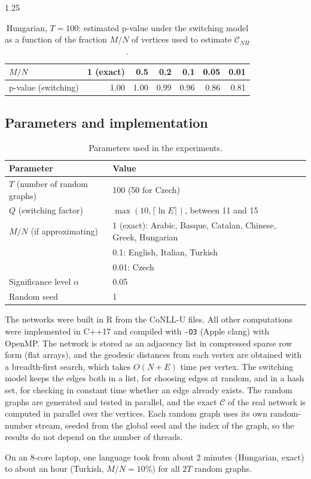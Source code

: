 \documentclass[12pt]{article}
\newcommand{\metric}{\mathcal{C}}
\begin{document}
\begin{spacing}{1.25}
\begin{table}[H]
    \centering
    \begin{tabular}{lrrrrrr}
        \toprule
        $M/N$ & 1 (exact) & 0.5 & 0.2 & 0.1 & 0.05 & 0.01 \\
        \midrule
        p-value (switching) & 1.00 & 1.00 & 0.99 & 0.96 & 0.86 & 0.81 \\
        \bottomrule
    \end{tabular}
    \caption{Hungarian, $T=100$: estimated p-value under the switching model as a function of the fraction $M/N$ of vertices used to estimate $\metric_{NH}$.}
    \label{tab:validation}
\end{table}

\subsection{Parameters and implementation}
\begin{table}[H]
    \centering
    \begin{tabular}{lp{8.5cm}}
        \toprule
        Parameter & Value \\
        \midrule
        $T$ (number of random graphs) & 100 (50 for Czech) \\
        $Q$ (switching factor) & $\max(10,\lceil\ln E\rceil)$, between 11 and 15 \\
        $M/N$ (if approximating) & 1 (exact): Arabic, Basque, Catalan, Chinese, Greek, Hungarian \\
         & 0.1: English, Italian, Turkish \\
         & 0.01: Czech \\
        Significance level $\alpha$ & 0.05 \\
        Random seed & 1 \\
        \bottomrule
    \end{tabular}
    \caption{Parameters used in the experiments.}
    \label{tab:params}
\end{table}

The networks were built in R from the CoNLL-U files. All other computations were implemented in C++17 and compiled with \texttt{-O3} (Apple clang) with OpenMP. The network is stored as an adjacency list in compressed sparse row form (flat arrays), and the geodesic distances from each vertex are obtained with a breadth-first search, which takes $O(N+E)$ time per vertex. The switching model keeps the edges both in a list, for choosing edges at random, and in a hash set, for checking in constant time whether an edge already exists. The random graphs are generated and tested in parallel, and the exact $\metric$ of the real network is computed in parallel over the vertices. Each random graph uses its own random-number stream, seeded from the global seed and the index of the graph, so the results do not depend on the number of threads.

On an 8-core laptop, one language took from about 2 minutes (Hungarian, exact) to about an hour (Turkish, $M/N=10\%$) for all $2T$ random graphs.

\end{spacing}
\newpage
\end{document}
